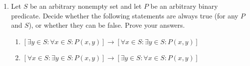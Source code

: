 \documentclass[11pt, oneside]{article}   	%
\begin{document}
\begin{enumerate}
\item Let $S$ be an arbitrary nonempty set and let $P$ be an arbitrary binary predicate. 
Decide whether the following statements are always true (for any $P$ and $S$), or whether they can be false. Prove your answers.
\begin{enumerate}
\item $[\exists y\in S: \forall x\in S:P(x,y)]\rightarrow [\forall x \in S: \exists y \in S:P(x,y)]$
\item $[\forall x \in S: \exists y \in S:P(x,y)]\rightarrow[\exists y \in S: \forall x \in S:P(x,y)]$
\end{enumerate}

\end{enumerate}
\end{document}
